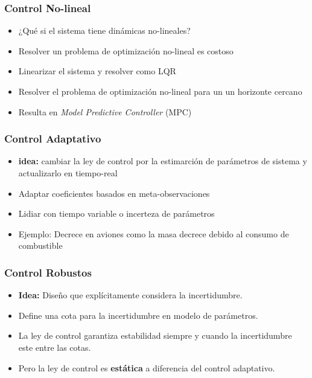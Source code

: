 \begin{frame}
    \frametitle{Control No-lineal}
    
    \begin{itemize}
        \item ¿Qué si el sistema tiene dinámicas no-lineales?
        \item Resolver un problema de optimización no-lineal es costoso
        \item Linearizar el sistema y resolver como LQR
        \item Resolver el problema de optimización no-lineal para un un horizonte cercano
        \item Resulta en \emph{Model Predictive Controller} (MPC)
    \end{itemize}
    
\end{frame}

\begin{frame}
    \frametitle{Control Adaptativo}
    
    \begin{itemize}
        \item \textbf{idea:} cambiar la ley de control por la estimarción de parámetros de sistema y actualizarlo en tiempo-real
        \item Adaptar coeficientes basados en meta-observaciones
        \item Lidiar con tiempo variable o incerteza de parámetros
        \item Ejemplo: Decrece en aviones como la masa decrece debido al consumo de combustible 
    \end{itemize}
    
\end{frame}

\begin{frame}
    \frametitle{Control Robustos}
    
    \begin{itemize}
        \item \textbf{Idea:} Diseño que explícitamente considera la incertidumbre.
        \item Define una cota para la incertidumbre en modelo de parámetros.
        \item La ley de control garantiza estabilidad siempre y cuando la incertidumbre este entre las cotas.
        \item Pero la ley de control es \textbf{estática} a diferencia del control adaptativo.
    \end{itemize}
    
\end{frame}

